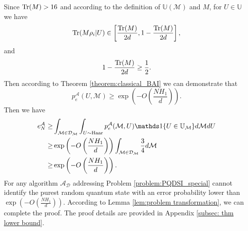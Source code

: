 \begin{proof-sketch}
    Since $\mathrm{Tr}(M) > 16$ and according to the definition of $\mathbb{U}(\mathcal{M})$ and $M$, for $U \in \mathbb{U}$ we have
    \begin{equation}
         \mathrm{Tr}(M\rho_i|U) \in \left[\frac{\mathrm{Tr}(M)}{2d}, 1- \frac{\mathrm{Tr}(M)}{2d}\right],
    \end{equation}
    and 
    \begin{equation}
        1- \frac{\mathrm{Tr}(M)}{2d} \geq \frac{1}{2}.
    \end{equation}
    Then according to Theorem \ref{theorem:classical_BAI} we can demonstrate that 
    \begin{equation}
        p_e^\mathcal{A}(U,\mathcal{M}) \geq \exp\left(- O\left( \frac{NH_1}{d}\right)\right).
    \end{equation}
    Then we have
    \begin{equation*}
        \begin{aligned}
            e^\mathcal{A}_N \geq & \int_{\mathcal{M} \in \mathcal{D}_{\mathcal{M}}} \int_{U \sim \Haar} p^\mathcal{A}_e(\mathcal{M},U)\indicator\{U \in \mathbb{U}_\mathcal{M}\} d\mathcal{M} dU \\
            \geq & \exp\left(-O\left( \frac{NH_1}{d}\right)\right)\int_{\mathcal{M} \in \mathcal{D}_{\mathcal{M}}}  \frac{3}{4} d\mathcal{M} \\
            \geq & \exp\left(- O\left( \frac{NH_1}{d}\right)\right).\\            
        \end{aligned}
    \end{equation*}
    For any algorithm $\mathcal{A}_{\mathcal{D}}$ addressing Problem \ref{problem:PQDSI_special} cannot identify the purest random quantum state with an error probability lower than $\exp\left(-O\left( \frac{NH_1}{d}\right)\right)$. According to Lemma \ref{lem:problem transformation}, we can complete the proof. The proof details are provided in Appendix \ref{subsec: thm lower bound}.
\end{proof-sketch}